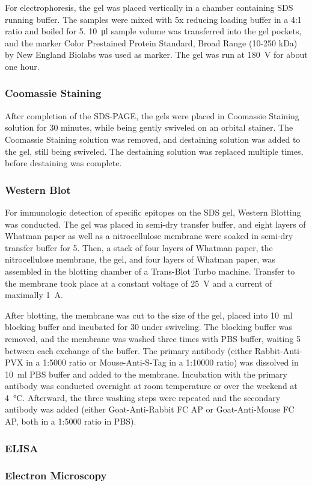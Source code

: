 For electrophoresis, the gel was placed vertically in a chamber containing SDS running buffer. The samples were mixed with 5x reducing loading buffer in a 4:1 ratio and boiled for \SI{5}{\min}. \SI{10}{\micro\litre} sample volume was transferred into the gel pockets, and the marker Color Prestained Protein Standard, Broad Range (10-250 kDa) by New England Biolabs was used as marker. The gel was run at \SI{180}{\volt} for about one hour. 

\subsubsection{Coomassie Staining}
After completion of the SDS-PAGE, the gels were placed in Coomassie Staining solution for 30 minutes, while being gently swiveled on an orbital stainer. The Coomassie Staining solution was removed, and destaining solution was added to the gel, still being swiveled. The destaining solution was replaced multiple times, before destaining was complete. 

\subsubsection{Western Blot}
For immunologic detection of specific epitopes on the SDS gel, Western Blotting was conducted. The gel was placed in semi-dry transfer buffer, and eight layers of Whatman paper as well as a nitrocellulose membrane were soaked in semi-dry transfer buffer for \SI{5}{\min}. Then, a stack of four layers of Whatman paper, the nitrocellulose membrane, the gel, and four layers of Whatman paper, was assembled in the blotting chamber of a Trans-Blot\textsuperscript{\textregistered} Turbo\textsuperscript{\texttrademark} machine. Transfer to the membrane took place at a constant voltage of \SI{25}{\volt} and a current of maximally \SI{1}{\ampere}.

After blotting, the membrane was cut to the size of the gel, placed into \SI{10}{\milli\litre} blocking buffer and incubated for \SI{30}{\min} under swiveling. The blocking buffer was removed, and the membrane was washed three times with PBS buffer, waiting \SI{5}{\min} between each exchange of the buffer. The primary antibody (either Rabbit-Anti-PVX in a 1:5000 ratio or Mouse-Anti-S-Tag in a 1:10000 ratio) was dissolved in \SI{10}{\milli\litre} PBS buffer and added to the membrane. Incubation with the primary antibody was conducted overnight at room temperature or over the weekend at \SI{4}{\degreeCelsius}. Afterward, the three washing steps were repeated and the secondary antibody was added (either Goat-Anti-Rabbit FC AP or Goat-Anti-Mouse FC AP, both in a 1:5000 ratio in PBS). 
\subsubsection{ELISA}
\subsubsection{Electron Microscopy}